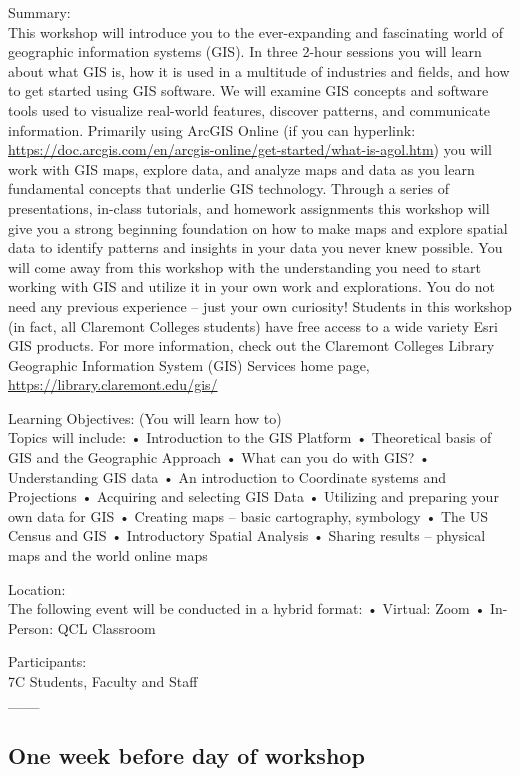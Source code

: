 \documentclass[
]{book}
\begin{document}
Summary:\\
This workshop will introduce you to the ever-expanding and fascinating world of geographic information systems (GIS). In three 2-hour sessions you will learn about what GIS is, how it is used in a multitude of industries and fields, and how to get started using GIS software. We will examine GIS concepts and software tools used to visualize real-world features, discover patterns, and communicate information. Primarily using ArcGIS Online (if you can hyperlink: \url{https://doc.arcgis.com/en/arcgis-online/get-started/what-is-agol.htm}) you will work with GIS maps, explore data, and analyze maps and data as you learn fundamental concepts that underlie GIS technology.
Through a series of presentations, in-class tutorials, and homework assignments this workshop will give you a strong beginning foundation on how to make maps and explore spatial data to identify patterns and insights in your data you never knew possible. You will come away from this workshop with the understanding you need to start working with GIS and utilize it in your own work and explorations. You do not need any previous experience -- just your own curiosity!
Students in this workshop (in fact, all Claremont Colleges students) have free access to a wide variety Esri GIS products. For more information, check out the Claremont Colleges Library Geographic Information System (GIS) Services home page, \url{https://library.claremont.edu/gis/}

Learning Objectives: (You will learn how to)\\
Topics will include:
• Introduction to the GIS Platform
• Theoretical basis of GIS and the Geographic Approach
• What can you do with GIS?
• Understanding GIS data
• An introduction to Coordinate systems and Projections
• Acquiring and selecting GIS Data
• Utilizing and preparing your own data for GIS
• Creating maps -- basic cartography, symbology
• The US Census and GIS
• Introductory Spatial Analysis
• Sharing results -- physical maps and the world online maps

Location:\\
The following event will be conducted in a hybrid format:
• Virtual: Zoom
• In-Person: QCL Classroom

Participants:\\
7C Students, Faculty and Staff\\
\_\_\_

\hypertarget{one-week-before-day-of-workshop}{%
\subsection{One week before day of workshop}\label{one-week-before-day-of-workshop}}
\end{document}
